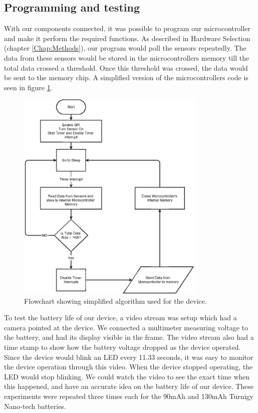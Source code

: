 \subsection{Programming and testing}
\label{Sec:Programming}
With our components connected,
it was possible to program our microcontroller and make it perform the required functions.
As described in Hardware Selection (chapter \ref{Chap:Methods}),
our program would poll the sensors repeatedly.
The data from these sensors would be stored in the microcontrollers memory till the total data crossed a threshold.
Once this threshold was crossed, the data would be sent to the memory chip.
A simplified version of the microcontrollers code is seen in figure \ref{Fig:MainAlgo}.
\begin{figure}
\begin{center}
\includegraphics[width=0.8\textwidth]{images/MainAlgo.eps}
\caption{Flowchart showing simplified algorithm used for the device.}
\label{Fig:MainAlgo}
\end{center}
\end{figure}
To test the battery life of our device,
a video stream was setup which had a camera pointed at the device.
We connected a multimeter measuring voltage to the battery,
and had its display visible in the frame.
The video stream also had a time stamp to show how the battery voltage dropped as the device operated.
Since the device would blink an LED every 11.33 seconds,
it was easy to monitor the device operation through this video.
When the device stopped operating,
the LED would stop blinking.
We could watch the video to see the exact time when this happened,
and have an accurate idea on the battery life of our device.
These experiments were repeated three times each for the 90mAh and 130mAh Turnigy Nano-tech batteries.

